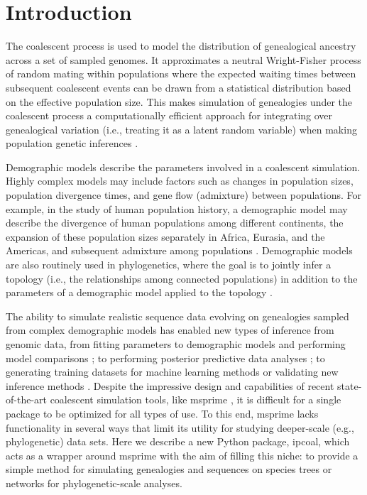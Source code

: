\documentclass[11pt]{article}
\begin{document}
\RaggedRight
\bigskip

\section{Introduction}
The coalescent process \cite{kingman_coalescent_1982,hudson_testing_1983} is used to model the distribution of genealogical ancestry across a set of sampled genomes. It approximates a neutral Wright-Fisher process of random mating within populations where the expected waiting times between subsequent coalescent events can be drawn from a statistical distribution based on the effective population size. This makes simulation of genealogies under the coalescent process \cite{hudson_generating_2002} a computationally efficient approach for integrating over genealogical variation (i.e., treating it as a latent random variable) when making population genetic inferences \cite{beerli_coalescent_2001}. 

Demographic models describe the parameters involved in a coalescent simulation. Highly complex models may include factors such as changes in population sizes, population divergence times, and gene flow (admixture) between populations. For example, in the study of human population history, a demographic model may describe the divergence of human populations among different continents, the expansion of these population sizes separately in Africa, Eurasia, and the Americas, and subsequent admixture among populations \cite{reich_who_2018,adrion_community_maintained_2019}. Demographic models are also routinely used in phylogenetics, where the goal is to jointly infer a topology (i.e., the relationships among connected populations) in addition to the parameters of a demographic model applied to the topology \cite{degnan_gene_2009,knowles_estimating_2011}. 

The ability to simulate realistic sequence data evolving on genealogies sampled from complex demographic models has enabled new types of inference from genomic data, from fitting parameters to demographic models and performing model comparisons \cite{chung_bayesian_2017}; to performing posterior predictive data analyses \cite{brown_predictive_2014}; to generating training datasets for machine learning methods \cite{schrider_learning_2017} or validating new inference methods \cite{adrion_community_maintained_2019}. Despite the impressive design and capabilities of recent state-of-the-art coalescent simulation tools, like msprime \cite{kelleher_efficient_2016}, it is difficult for a single package to be optimized for all types of use. To this end, msprime lacks functionality in several ways that limit its utility for studying deeper-scale (e.g., phylogenetic) data sets. Here we describe a new Python package, ipcoal, which acts as a wrapper around msprime with the aim of filling this niche: to provide a simple method for simulating genealogies and sequences on species trees or networks for phylogenetic-scale analyses.
\end{document}
